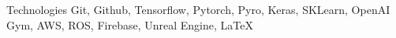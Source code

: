\cvskill
  {Technologies}
    {Git, Github, Tensorflow, Pytorch, Pyro, Keras, SKLearn, OpenAI Gym, AWS, ROS, Firebase, Unreal Engine, LaTeX}